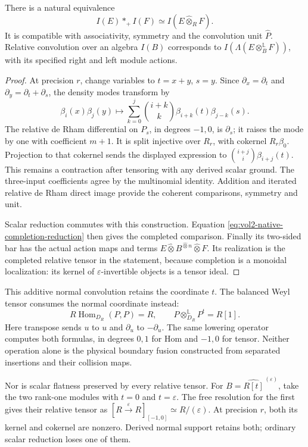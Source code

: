 \begin{proposition}\label{prop:vol2-native-normal-convolution}
There is a natural equivalence
\[
                    I(E)*_+I(F)\simeq
                    I(E\widehat\otimes_R F).
\]
It is compatible with associativity, symmetry and the convolution unit
\(\widehat P\). Relative convolution over an algebra \(I(B)\)
corresponds to \(I(\Lambda(E\otimes_B^{\mathbb L}F))\), with its
specified right and left module actions.
\end{proposition}

\begin{proof}
At precision \(r\), change variables to \(t=x+y\), \(s=y\).
Since \(\partial_x=\partial_t\) and
\(\partial_y=\partial_t+\partial_s\), the density modes transform by
\[
 \beta_i(x)\beta_j(y)\longmapsto
       \sum_{k=0}^j\binom{i+k}{k}
                 \beta_{i+k}(t)\beta_{j-k}(s).
\]
The relative de Rham differential on \(P_s\), in degrees \(-1,0\),
is \(\partial_s\); it raises the mode by one with coefficient \(m+1\).
It is split injective over \(R_r\), with cokernel \(R_r\beta_0\).
Projection to that cokernel sends the displayed expression to
\(\binom{i+j}{i}\beta_{i+j}(t)\). This remains a contraction after
tensoring with any derived scalar ground.
The three-input coefficients agree by the multinomial identity.
Addition and iterated relative de Rham direct image provide the
coherent comparisons, symmetry and unit.

Scalar reduction commutes with this construction. Equation
\eqref{eq:vol2-native-completion-reduction} then gives the completed
comparison. Finally its two-sided bar has the actual action maps and
terms \(E\widehat\otimes B^{\widehat\otimes n}\widehat\otimes F\).
Its realization is the completed relative tensor in the statement,
because completion is a monoidal localization: its kernel of
\(\varepsilon\)-invertible objects is a tensor ideal.
\end{proof}

This additive normal convolution retains the coordinate \(t\).
The balanced Weyl tensor consumes the normal coordinate instead:
\[
 R\operatorname{Hom}_{D_R}(P,P)=R,
 \qquad P\otimes_{D_R}^{\mathbb L}P^t=R[1].
\]
Here transpose sends \(u\) to \(u\) and \(\partial_u\) to
\(-\partial_u\). The same lowering operator computes both formulas,
in degrees \(0,1\) for Hom and \(-1,0\) for tensor.
Neither operation alone is the physical boundary fusion constructed
from separated insertions and their collision maps.

Nor is scalar flatness preserved by every relative tensor. For
\(B=\widehat{R[t]}^{\,(\varepsilon)}\), take the two rank-one modules
with \(t=0\) and \(t=\varepsilon\). The free resolution for the first
gives their relative tensor as
\([R\xrightarrow{\varepsilon}R]_{[-1,0]}\simeq R/(\varepsilon)\).
At precision \(r\), both its kernel and cokernel are nonzero.
Derived normal support retains both; ordinary scalar reduction loses
one of them.

